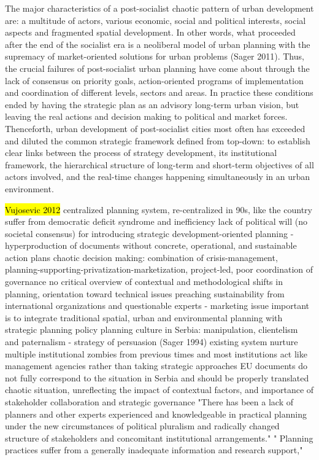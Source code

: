 \documentclass[11pt]{report}
\begin{document}
The major characteristics of a post-socialist chaotic pattern of urban development are: a multitude of actors, various economic, social and political interests, social aspects and fragmented spatial development. In other words, what proceeded after the end of the socialist era is a neoliberal model of urban planning with the supremacy of market-oriented solutions for urban problems (Sager 2011). Thus, the crucial failures of post-socialist urban planning have come about through the lack of consensus on priority goals, action-oriented programs of implementation and coordination of different levels, sectors and areas. In practice these conditions ended by having the strategic plan as an advisory long-term urban vision, but leaving the real actions and decision making to political and market forces. Thenceforth, urban development of post-socialist cities most often has exceeded and diluted the common strategic framework defined from top-down: to establish clear links between the process of strategy development, its institutional framework, the hierarchical structure of long-term and short-term objectives of all actors involved, and the real-time changes happening simultaneously in an urban environment.

\hl{Vujosevic 2012}
centralized planning system, re-centralized in 90s, like the country
suffer from democratic deficit syndrome and inefficiency
lack of political will (no societal consensus) for introducing strategic development-oriented planning - hyperproduction of documents without concrete, operational, and sustainable action plans
chaotic decision making: combination of crisis-management, planning-supporting-privatization-marketization, project-led, poor coordination of governance
no critical overview of contextual and methodological shifts in planning, orientation toward technical issues
preaching sustainability from international organizations and questionable experts - marketing issue
important  is to integrate traditional spatial, urban and environmental planning with strategic planning policy
planning culture in Serbia: manipulation, clientelism and paternalism - strategy of persuasion (Sager 1994)
existing system nurture multiple institutional zombies from previous times and most institutions act like management agencies rather than taking strategic approaches
EU documents do not fully correspond to the situation in Serbia and should be properly translated
chaotic situation, unreflecting the impact of contextual factors, and importance of stakeholder collaboration and strategic governance
"There has been a lack of planners and other experts experienced and knowledgeable in practical planning under the new circumstances of political pluralism and radically
changed structure of stakeholders and concomitant institutional arrangements."
" Planning practices suffer from a generally inadequate information and research support,"
\end{document}
